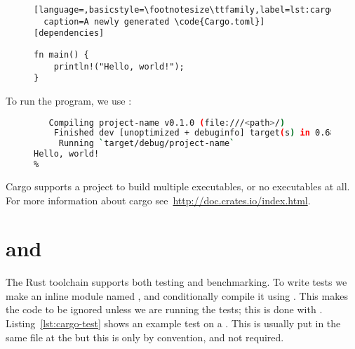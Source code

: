 \documentclass[b5paper]{report}
\begin{document}
\begin{appendices}
\begin{figure}[p]
\begin{lstlisting}[language=,basicstyle=\footnotesize\ttfamily,label=lst:cargo.toml,
  caption=A newly generated \code{Cargo.toml}]
[dependencies]
  \end{lstlisting}
\end{figure}

\begin{figure}[p]
  \begin{lstlisting}[caption=Hello World in Rust,label=lst:hello-world]
fn main() {
    println!("Hello, world!");
}
  \end{lstlisting}
\end{figure}

  To run the program, we use \cargo{}:

  \begin{figure}[ht]
  \begin{lstlisting}[language=Bash,numbers=none]
% cargo run
   Compiling project-name v0.1.0 (file:///<path>/)
    Finished dev [unoptimized + debuginfo] target(s) in 0.68 secs
     Running `target/debug/project-name`
Hello, world!
%
  \end{lstlisting}
\end{figure}

  Cargo supports a project to build multiple executables, or no executables at all.
  For more information about cargo see~\url{http://doc.crates.io/index.html}.

  \section{\code{\#[test]} and \code{\#[bench]}}
  \label{sec:rust-test}
  The Rust toolchain supports both testing and benchmarking. To write tests we
  make an inline module named , and conditionally compile it using
  . This makes the code to be ignored unless we are running
  the tests; this is done with . Listing~\ref{lst:cargo-test}
  shows an example test on a . This is usually put in the same file
  at the  but this is only by convention, and not required.


\end{appendices}
\end{document}
